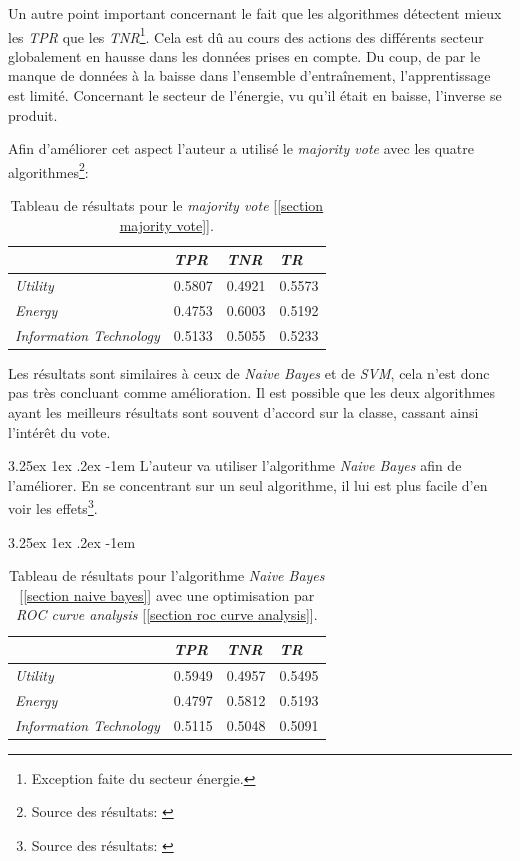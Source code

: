 \documentclass[a4paper, 11pt]{article}
\makeatletter
\renewcommand\paragraph{\@startsection{paragraph}{5}{\z@}%
  {3.25ex \@plus1ex \@minus.2ex}%
  {-1em}%
  {\normalfont\normalsize\bfseries}}
\makeatother
\begin{document}
Un autre point important concernant le fait que les algorithmes détectent mieux les \textit{TPR} que les \textit{TNR}\footnote{Exception faite du secteur énergie.}. Cela est dû au cours des actions des différents secteur globalement en hausse dans les données prises en compte. Du coup, de par le manque de données à la baisse dans l'ensemble d'entraînement, l'apprentissage est limité. Concernant le secteur de l'énergie, vu qu'il était en baisse, l'inverse se produit.

Afin d'améliorer cet aspect l'auteur a utilisé le \textit{majority vote} avec les quatre algorithmes\footnote{Source des résultats: \cite{machine_learning_automated_trading}}:

\begin{table}[h!]
	\centering
\begin{tabular}{|l|l|l|l|}
	\hline
	\ & \textit{TPR} & \textit{TNR} & \textit{TR}\\
	\hline
	\textit{Utility} & 0.5807 & 0.4921 & 0.5573 \\
	\hline
	\textit{Energy} & 0.4753 & 0.6003 & 0.5192\\
	\hline
	\textit{Information Technology} & 0.5133 & 0.5055 & 0.5233\\
	\hline
\end{tabular}
\caption{Tableau de résultats pour le \textit{majority vote} [\ref{section majority vote}].}
\end{table}

Les résultats sont similaires à ceux de \textit{Naive Bayes} et de \textit{SVM}, cela n'est donc pas très concluant comme amélioration. Il est possible que les deux algorithmes ayant les meilleurs résultats sont souvent d'accord sur la classe, cassant ainsi l'intérêt du vote.

\paragraph{}
L'auteur va utiliser l'algorithme \textit{Naive Bayes} afin de l'améliorer. En se concentrant sur un seul algorithme, il lui est plus facile d'en voir les effets\footnote{Source des résultats: \cite{machine_learning_automated_trading}}.

\paragraph{}
\begin{table}[h!]
	\centering
\begin{tabular}{|l|l|l|l|}
	\hline
	\ & \textit{TPR} & \textit{TNR} & \textit{TR}\\
	\hline
	\textit{Utility} & 0.5949 & 0.4957 & 0.5495 \\
	\hline
	\textit{Energy} & 0.4797 & 0.5812 & 0.5193\\
	\hline
	\textit{Information Technology} & 0.5115 & 0.5048 & 0.5091\\
	\hline
\end{tabular}
\caption{Tableau de résultats pour l'algorithme \textit{Naive Bayes} [\ref{section naive bayes}] avec une optimisation par \textit{ROC curve analysis} [\ref{section roc curve analysis}].}
\end{table}
\end{document}
